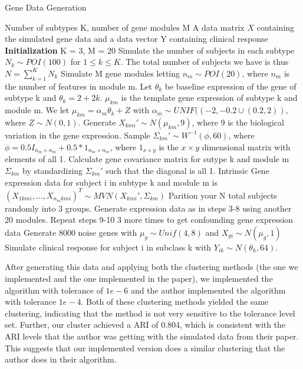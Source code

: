 \documentclass{statsoc}
\begin{document}
\begin{algorithm}
    \caption{Gene Data Generation}
    \begin{algorithmic}[1]
        \INPUT Number of subtypes K, number of gene modules M
        \OUTPUT A data matrix $X$ containing the simulated gene data and a data vector Y containing clinical response
        \STATE \textbf{Initialization} K = 3, M = 20
        \STATE Simulate the number of subjects in each subtype $N_k \sim POI(100)$ for $1 \leq k \leq K$. The total number of subjects we have is thus $N = \sum_{k=1}^K N_k$
        \STATE Simulate M gene modules letting $n_m \sim POI(20)$, where $n_m$ is the number of features in module m.
        \STATE Let $\theta_k$ be baseline expression of the gene of subtype k and $\theta_k = 2 + 2k$. $\mu_{km}$ is the template gene expression of subtype k and module m. We let $\mu_{km} = \alpha_m\theta_k + Z$ with $\alpha_m \sim UNIF((-2,-0.2 \cup (0.2,2))$, where $Z \sim N(0,1)$.
        \STATE Generate $X_{kmi}' \sim N(\mu_{km}, 9)$, where 9 is the biological variation in the gene expression. 
        \STATE Sample $\Sigma_{km}' \sim W^{-1}(\phi, 60)$, where $\phi = 0.5 I_{n_m \times n_m} + 0.5*1_{n_m\times n_m}$, where $1_{x\times y}$ is the $x\times y$ dimensional matrix with elements of all 1.
        \STATE Calculate gene covariance matrix for sutype k and module m $\Sigma_{km}$ by standardizing $\Sigma_{km}'$ such that the diagonal is all 1.
        \STATE Intrinsic Gene expression data for subject i in subtype k and module m is $(X_{1kmi}, \ldots, X_{n_mkmi})^T \sim MVN(X_{kmi}', \Sigma_{km})$
        \STATE Parition your N total subjects randomly into 3 groups.
        \STATE Generate expression data as in steps 3-8 using another 20 modules.
        \STATE Repeat steps 9-10 3 more times to get confounding gene expression data
        \STATE Generate 8000 noise genes with $\mu_g \sim Unif(4,8)$ and $X_{gi} \sim N(\mu_g, 1)$
        \STATE Simulate clinical response for subject i in subclass k with $Y_{ik} \sim N(\theta_k, 64)$.
    \end{algorithmic}
\end{algorithm}


After generating this data and applying both the clustering methods (the one we implemented and the one implemented in the paper), we implemented the algorithm with tolerance of $1e-6$ and the author implemented the algorithm with tolerance $1e-4$. Both of these clustering methods yielded the same clustering, indicating that the method is not very sensitive to the tolerance level set. Further, our cluster achieved a ARI of 0.804, which is consistent with the ARI levels that the author was getting with the simulated data from their paper. This suggests that our implemented version does a similar clustering that the author does in their algorithm. 
\end{document}
